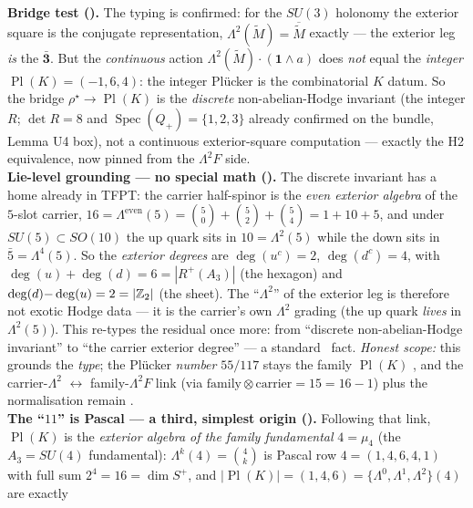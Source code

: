 \begin{keybox}
\smallskip\\
\noindent\textbf{Bridge test ().} The typing is confirmed: for the $SU(3)$
holonomy the exterior square is the conjugate representation, $\Lambda^2(\widetilde M)=\overline{\widetilde
M}$ exactly --- the exterior leg \emph{is} the $\mathbf{\bar3}$. But the \emph{continuous} action
$\Lambda^2(\widetilde M)\cdot(\mathbf1\wedge a)$ does \emph{not} equal the \emph{integer} $\operatorname{Pl}(K)=(-1,6,4)$:
the integer Plücker is the combinatorial $K$ datum. So the bridge $\rho^\star\!\to\!\operatorname{Pl}(K)$ is
the \emph{discrete} non-abelian-Hodge invariant (the integer $R$; $\det R=8$ and
$\operatorname{Spec}(Q_+)=\{1,2,3\}$ already confirmed on the bundle, Lemma U4 box), not a continuous
exterior-square computation --- exactly the H2 equivalence, now pinned from the $\Lambda^2F$ side.
\smallskip\\
\noindent\textbf{Lie-level grounding --- no special math ().} The discrete
invariant has a home already in TFPT: the carrier half-spinor is the \emph{even exterior algebra} of the
$5$-slot carrier, $16=\Lambda^{\mathrm{even}}(5)=\binom50+\binom52+\binom54=1+10+5$, and under
$SU(5)\subset SO(10)$ the up quark sits in $10=\Lambda^2(5)$ while the down sits in
$\bar5=\Lambda^4(5)$. So the \emph{exterior degrees} are $\deg(u^c)=2$, $\deg(d^c)=4$, with
$\deg(u){+}\deg(d)=6=|R^+(A_3)|$ (the hexagon) and $\deg(d){-}\deg(u)=2=|\mathbb Z_2|$ (the sheet). The
``$\Lambda^2$'' of the exterior leg is therefore not exotic Hodge data --- it is the carrier's own
$\Lambda^2$ grading (the up quark \emph{lives} in $\Lambda^2(5)$). This re-types the residual once more:
from ``discrete non-abelian-Hodge invariant'' to ``the carrier exterior degree'' --- a standard \mE\ fact.
\emph{Honest scope:} this grounds the \emph{type}; the Plücker \emph{number} $55/117$ stays the family
$\operatorname{Pl}(K)$ \mE, and the carrier-$\Lambda^2$ $\leftrightarrow$ family-$\Lambda^2F$ link (via
$\text{family}\otimes\text{carrier}=15=16{-}1$) plus the normalisation remain \mC.
\smallskip\\
\noindent\textbf{The ``$11$'' is Pascal --- a third, simplest origin ().}
Following that link, $\operatorname{Pl}(K)$ is the \emph{exterior algebra of the family fundamental}
$4=\mu_4$ (the $A_3{=}SU(4)$ fundamental): $\Lambda^k(4)=\binom4k$ is Pascal row $4=(1,4,6,4,1)$ with full
sum $2^4=16=\dim S^+$, and $|\operatorname{Pl}(K)|=(1,4,6)=\{\Lambda^0,\Lambda^1,\Lambda^2\}(4)$ are exactly

\end{keybox}
